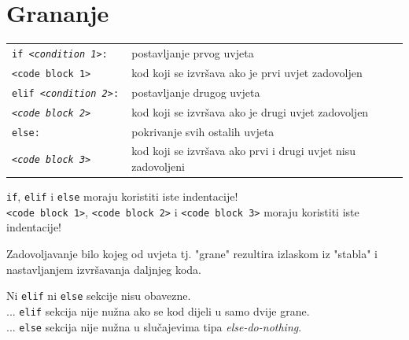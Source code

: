 \documentclass[10pt]{article}
\begin{document}
    \section*{\color{NavyBlue} Grananje}
    \begin{tabular}{|>{\tt}p{9.00cm}|>{}p{15.50cm}|}
        \hline
        if \textit{<condition 1>}:                   & postavljanje prvog uvjeta                                         \\ 
        \hspace{5mm}<code block 1>                   & kod koji se izvršava ako je prvi uvjet zadovoljen                 \\                             
        elif \textit{<condition 2>}:                 & postavljanje drugog uvjeta                                        \\ 
        \hspace{5mm}\textit{<code block 2}>          & kod koji se izvršava ako je drugi uvjet zadovoljen                \\ 
        else:                                        & pokrivanje svih ostalih uvjeta                                    \\ 
        \hspace{5mm}\textit{<code block 3}>          & kod koji se izvršava ako prvi i drugi uvjet nisu zadovoljeni      \\ \hline
    \end{tabular}
    \begin{center}
        \footnotesize
        \texttt{if}, \texttt{elif} i \texttt{else} moraju koristiti iste indentacije! \\
        \texttt{<code block 1>}, \texttt{<code block 2>} i \texttt{<code block 3>} moraju koristiti iste indentacije!
    \end{center}
    \begin{center}
        \footnotesize
        Zadovoljavanje bilo kojeg od uvjeta tj. "grane" rezultira izlaskom iz "stabla" i nastavljanjem izvršavanja daljnjeg koda.
    \end{center}
    \begin{center}
        \footnotesize
        Ni \texttt{elif} ni \texttt{else} sekcije nisu obavezne. \\
        ... \texttt{elif} sekcija nije nužna ako se kod dijeli u samo dvije grane. \\
        ... \texttt{else} sekcija nije nužna u slučajevima tipa \textit{else-do-nothing}. \\
    \end{center}
\end{document}
